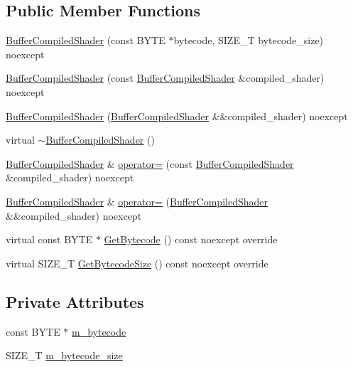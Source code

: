 \subsection*{Public Member Functions}
\begin{DoxyCompactItemize}
\item 
\hyperlink{classmage_1_1_buffer_compiled_shader_a00a4058f4a1fe43c5e049bb3bdfa0d99}{Buffer\+Compiled\+Shader} (const B\+Y\+TE $\ast$bytecode, S\+I\+Z\+E\+\_\+T bytecode\+\_\+size) noexcept
\item 
\hyperlink{classmage_1_1_buffer_compiled_shader_a2677aec398b8e12355af6451b376db5a}{Buffer\+Compiled\+Shader} (const \hyperlink{classmage_1_1_buffer_compiled_shader}{Buffer\+Compiled\+Shader} \&compiled\+\_\+shader) noexcept
\item 
\hyperlink{classmage_1_1_buffer_compiled_shader_ac878e7c450de7205d056b27e083adfca}{Buffer\+Compiled\+Shader} (\hyperlink{classmage_1_1_buffer_compiled_shader}{Buffer\+Compiled\+Shader} \&\&compiled\+\_\+shader) noexcept
\item 
virtual \hyperlink{classmage_1_1_buffer_compiled_shader_a39ca72436bfd68e14c41fead70540edc}{$\sim$\+Buffer\+Compiled\+Shader} ()
\item 
\hyperlink{classmage_1_1_buffer_compiled_shader}{Buffer\+Compiled\+Shader} \& \hyperlink{classmage_1_1_buffer_compiled_shader_ab461431d4a0da425be8e9b2095e4f0b1}{operator=} (const \hyperlink{classmage_1_1_buffer_compiled_shader}{Buffer\+Compiled\+Shader} \&compiled\+\_\+shader) noexcept
\item 
\hyperlink{classmage_1_1_buffer_compiled_shader}{Buffer\+Compiled\+Shader} \& \hyperlink{classmage_1_1_buffer_compiled_shader_a23a22f61d8b81eedfc691f787c6b2111}{operator=} (\hyperlink{classmage_1_1_buffer_compiled_shader}{Buffer\+Compiled\+Shader} \&\&compiled\+\_\+shader) noexcept
\item 
virtual const B\+Y\+TE $\ast$ \hyperlink{classmage_1_1_buffer_compiled_shader_ae6b2b4b5c9b96d7ca680724ccf0affb3}{Get\+Bytecode} () const noexcept override
\item 
virtual S\+I\+Z\+E\+\_\+T \hyperlink{classmage_1_1_buffer_compiled_shader_aa9ab3a1df896367280c259734ff29bc0}{Get\+Bytecode\+Size} () const noexcept override
\end{DoxyCompactItemize}
\subsection*{Private Attributes}
\begin{DoxyCompactItemize}
\item 
const B\+Y\+TE $\ast$ \hyperlink{classmage_1_1_buffer_compiled_shader_a76b0b5a034c4d8b8fd0d424cac66dccc}{m\+\_\+bytecode}
\item 
S\+I\+Z\+E\+\_\+T \hyperlink{classmage_1_1_buffer_compiled_shader_a16839a71dbb2092793f4fba1a6cfe29e}{m\+\_\+bytecode\+\_\+size}
\end{DoxyCompactItemize}
